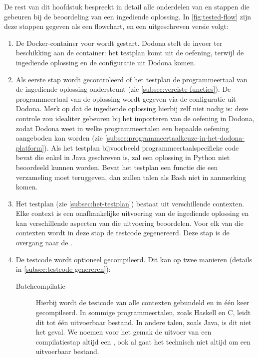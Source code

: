 De rest van dit hoofdstuk bespreekt in detail alle onderdelen van en stappen die gebeuren bij de beoordeling van een ingediende oplossing.
In \cref{fig:tested-flow} zijn deze stappen gegeven als een flowchart, en een uitgeschreven versie volgt:

\begin{enumerate}
    \item De Docker-container voor \tested{} wordt gestart.
    Dodona stelt de invoer ter beschikking aan de container: het testplan komt uit de oefening, terwijl de ingediende oplossing en de configuratie uit Dodona komen.
    \item Als eerste stap wordt gecontroleerd of het testplan de programmeertaal van de ingediende oplossing ondersteunt (zie \cref{subsec:vereiste-functies}).
    De programmeertaal van de oplossing wordt gegeven via de configuratie uit Dodona.
    Merk op dat de ingediende oplossing hierbij zelf niet nodig is: deze controle zou idealiter gebeuren bij het importeren van de oefening in Dodona, zodat Dodona weet in welke programmeertalen een bepaalde oefening aangeboden kan worden (zie \cref{subsec:programmeertaalkeuze-in-het-dodona-platform}).
    Als het testplan bijvoorbeeld programmeertaalspecifieke code bevat die enkel in Java geschreven is, zal een oplossing in Python niet beoordeeld kunnen worden.
    Bevat het testplan een functie die een verzameling moet teruggeven, dan zullen talen als Bash niet in aanmerking komen.
    \item Het testplan (zie \cref{subsec:het-testplan}) bestaat uit verschillende contexten.
    Elke context is een onafhankelijke uitvoering van de ingediende oplossing en kan verschillende aspecten van die uitvoering beoordelen.
    Voor elk van die contexten wordt in deze stap de testcode gegenereerd.
    Deze stap is de overgang naar de .
    \item De testcode wordt optioneel gecompileerd.
    Dit kan op twee manieren (details in \cref{subsec:testcode-genereren}):
    \begin{description}
        \item[Batchcompilatie]
        Hierbij wordt de testcode van alle contexten gebundeld en in één keer gecompileerd.
        In sommige programmeertalen, zoals Haskell en C, leidt dit tot één uitvoerbaar bestand.
        In andere talen, zoals Java, is dit niet het geval.
        We noemen voor het gemak de uitvoer van een compilatiestap altijd een , ook al gaat het technisch niet altijd om een uitvoerbaar bestand.

\end{description}
\end{enumerate}
